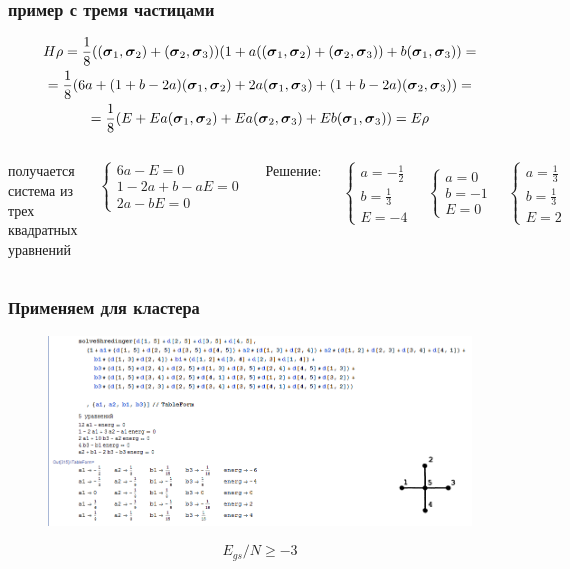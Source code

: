 \documentclass{beamer}
\begin{document}
\begin{frame}
\frametitle{пример с тремя частицами}
\small
$$\begin{gathered}
H\rho=\frac18(({\boldsymbol{\sigma}}_1,{\boldsymbol{\sigma}}_2)+({\boldsymbol{\sigma}}_2,{\boldsymbol{\sigma}}_3)) (1+a(({\boldsymbol{\sigma}}_1,{\boldsymbol{\sigma}}_2)+({\boldsymbol{\sigma}}_2,{\boldsymbol{\sigma}}_3))+b({\boldsymbol{\sigma}}_1,{\boldsymbol{\sigma}}_3)) =\\
= \frac18(6 a +(1+b- 2 a) ({\boldsymbol{\sigma}}_1, {\boldsymbol{\sigma}}_2)  + 2 a ({\boldsymbol{\sigma}}_1, {\boldsymbol{\sigma}}_3) +(1+b- 2 a) ({\boldsymbol{\sigma}}_2, {\boldsymbol{\sigma}}_3)) =\\
= \frac18(E+E a({\boldsymbol{\sigma}}_1,{\boldsymbol{\sigma}}_2)+E a({\boldsymbol{\sigma}}_2,{\boldsymbol{\sigma}}_3) + E b({\boldsymbol{\sigma}}_1,{\boldsymbol{\sigma}}_3)) = E\rho
\end{gathered}$$

\begin{columns}[c] %

получается система из трех квадратных уравнений

$$
\begin{cases}
6 a-E=0\\
1-2 a+b-a E=0\\
2 a-b E=0
\end{cases}
$$

Решение:

$$
\begin{cases}
a=-\frac12 \\b= \frac13 \\E=-4
\end{cases} \quad
\begin{cases}
a=0 \\b=-1 \\E=0
\end{cases} \quad
\begin{cases}
a=\frac13 \\b=\frac13 \\E=2
\end{cases} \quad
$$

\end{columns}
\normalsize
\end{frame}
\begin{frame}
\frametitle{Применяем для кластера}
\begin{figure}
\includegraphics[width=1\linewidth]{solve-crest.png}
\end{figure}
$$E_{gs}/N\geqslant -3$$

\end{frame}
\end{document}
